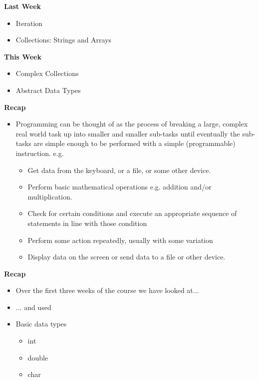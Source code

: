 \documentclass{beamer}
\begin{document}
 \begin{frame}
\begin{center}
\textbf{Last Week}
\end{center}
\begin{itemize}
\item Iteration
\item Collections:  Strings and Arrays
\end{itemize}
\end{frame}

\begin{frame}
\begin{center}
\textbf{This Week}
\end{center}
\begin{itemize}
\item Complex Collections
\item Abstract Data Types
\end{itemize}
\end{frame}
 
 \begin{frame}
\begin{center}
\textbf{Recap}
\end{center}
\begin{itemize}
\item Programming can be thought of as the process of breaking a large, complex real world task up into smaller and smaller sub-tasks until eventually the sub-tasks are simple enough to be performed with a simple (programmable) instruction.  e.g.
\begin{itemize}
\item Get data from the keyboard, or a  file, or some other device.
\item Perform basic mathematical operations e.g.  addition and/or multiplication.
\item Check for certain conditions and execute an appropriate sequence of statements in line with those condition
\item Perform some action repeatedly, usually with some variation
\item Display data on the screen or send data to a  file or other device.
\end{itemize}
\end{itemize}
\end{frame}

\begin{frame}
\begin{center}
\textbf{Recap}
\end{center}
\begin{itemize}
\item Over the first three weeks of the course we have looked at...
\item ... and used 
\bigskip
\item Basic data types

\begin{itemize}
\item int
\item double
\item char
\end{itemize}
\end{itemize}
\end{frame}
\end{document}
